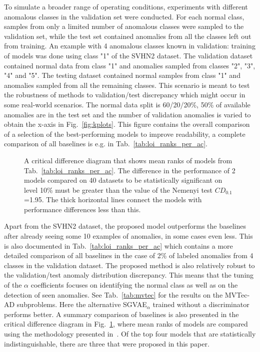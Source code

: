 

To simulate a broader range of operating conditions, experiments with different anomalous classes in the validation set were conducted. For each normal class, samples from only a limited number of anomalous classes were sampled to the validation set, while the test set contained anomalies from all the classes left out from training. An example with 4 anomalous classes known in validation: training of models was done using class "1" of the SVHN2 dataset. The validation dataset contained normal data from class "1" and anomalies sampled from classes "2", "3", "4" and "5". The testing dataset contained normal samples from class "1" and anomalies sampled from all the remaining classes. This scenario is meant to test the robustness of methods to validation/test discrepancy which might occur in some real-world scenarios. The normal data split is 60/20/20\%, 50\% of available anomalies are in the test set and the number of validation anomalies is varied to obtain the x-axis in Fig.~\ref{fig:kplots}. This figure contains the overall comparison of a selection of the best-performing models to improve readability, a complete comparison of all baselines is e.g. in Tab.~\ref{tab:loi_ranks_per_ac}.

\begin{figure}[ht!] 
    \centering
    
    \caption{A critical difference diagram that shows mean ranks of models from Tab.~\ref{tab:loi_ranks_per_ac}. The difference in the performance of 2 models compared on 40 datasets to be statistically significant on level 10\% must be greater than the value of the Nemenyi test $CD_{0.1}$=1.95. The thick horizontal lines connect the models with performance differences less than this.}
    \label{fig:cd}
\end{figure}

Apart from the SVHN2 dataset, the proposed model outperforms the baselines after already seeing some 10 examples of anomalies, in some cases even less. This is also documented in Tab.~\ref{tab:loi_ranks_per_ac} which contains a more detailed comparison of all baselines in the case of 2\% of labeled anomalies from 4 classes in the validation dataset. The proposed method is also relatively robust to the validation/test anomaly distribution discrepancy. This means that the tuning of the $\alpha$ coefficients focuses on identifying the normal class as well as on the detection of seen anomalies. See Tab.~\ref{tab:mvtec} for the results on the MVTec-AD subproblems. Here the alternative SGVAE$_{\alpha}$ trained without a discriminator performs better. A summary comparison of baselines is also presented in the critical difference diagram in Fig.~\ref{fig:cd}, where mean ranks of models are compared using the methodology presented in~\cite{demsar2006statistical}. Of the top four models that are statistically indistinguishable, there are three that were proposed in this paper.

